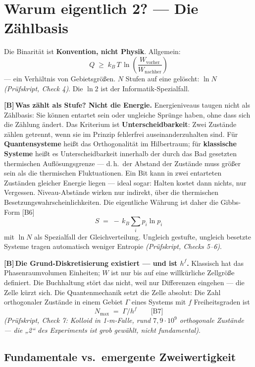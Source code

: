 \documentclass[11pt,a4paper]{article}
\newcommand{\LB}{\textcolor{layB}{\textbf{\footnotesize\textsf{[B]}}}\,}
\newcommand{\pruef}[1]{{\small\itshape(Prüfskript, #1)}}
\begin{document}
\section{Warum eigentlich 2? --- Die Zählbasis}
\label{sec:zaehlbasis}

Die Binarität ist \textbf{Konvention, nicht Physik}. Allgemein:
\[
  Q \;\ge\; k_B\,T\,\ln\!\left(\frac{W_{\text{vorher}}}{W_{\text{nachher}}}\right)
\]
--- ein Verhältnis von Gebietsgrößen. $N$ Stufen auf eine gelöscht: $\ln N$
\pruef{Check 4}. Die $\ln 2$ ist der Informatik-Spezialfall.

\LB \textbf{Was zählt als Stufe? Nicht die Energie.} Energieniveaus taugen nicht
als Zählbasis: Sie können entartet sein oder ungleiche Sprünge haben, ohne dass
sich die Zählung ändert. Das Kriterium ist \textbf{Unterscheidbarkeit}: Zwei
Zustände zählen getrennt, wenn sie im Prinzip fehlerfrei auseinanderzuhalten sind.
Für \textbf{Quantensysteme} heißt das Orthogonalität im Hilbertraum; für
\textbf{klassische Systeme} heißt es Unterscheidbarkeit innerhalb der durch das
Bad gesetzten thermischen Auflösungsgrenze --- d.\,h.\ der Abstand der Zustände
muss größer sein als die thermischen Fluktuationen. Ein Bit kann in zwei
entarteten Zuständen gleicher Energie liegen --- ideal sogar: Halten kostet dann
nichts, nur Vergessen. Niveau-Abstände wirken nur indirekt, über die thermischen
Besetzungswahrscheinlichkeiten. Die eigentliche Währung ist daher die Gibbs-Form
[B6]
\[
  S \;=\; -\,k_B \sum_i p_i \ln p_i
\]
mit $\ln N$ als Spezialfall der Gleichverteilung. Ungleich gestufte, ungleich
besetzte Systeme tragen automatisch weniger Entropie \pruef{Checks 5--6}.

\LB \textbf{Die Grund-Diskretisierung existiert --- und ist $h^f$.} Klassisch hat
das Phasenraumvolumen Einheiten; $W$ ist nur bis auf eine willkürliche Zellgröße
definiert. Die Buchhaltung stört das nicht, weil nur Differenzen eingehen --- die
Zelle kürzt sich. Die Quantenmechanik setzt die Zelle absolut: Die Zahl
orthogonaler Zustände in einem Gebiet $\Gamma$ eines Systems mit $f$
Freiheitsgraden ist
\[
  N_{\max} \;=\; \Gamma / h^f \qquad \text{[B7]}
\]
\pruef{Check 7: Kolloid in 1-\textmu m-Falle, rund $7{,}9\cdot10^{9}$ orthogonale
Zustände --- die „2“ des Experiments ist grob gewählt, nicht fundamental}.

\subsection{Fundamentale vs.\ emergente Zweiwertigkeit}
\end{document}
